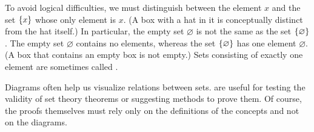 \begin{note}
  To avoid logical difficulties, we must distinguish between the element \(x\) and the set \(\left\lbrace x\right\rbrace\) whose only element is \(x\).
  (A box with a hat in it is conceptually distinct from the hat itself.)
  In particular, the empty set \(\varnothing\) is not the same as the set \(\left\lbrace\varnothing\right\rbrace\).
  The empty set \(\varnothing\) contains no elements, whereas the set \(\left\lbrace\varnothing\right\rbrace\) has one element \(\varnothing\).
  (A box that contains an empty box is not empty.)
  Sets consisting of exactly one element are sometimes called \textbf{}.
\end{note}

\begin{note}
  Diagrams often help us visualize relations between sets.
  \textbf{} are useful for testing the validity of set theory theorems or suggesting methods to prove them.
  Of course, the proofs themselves must rely only on the definitions of the concepts and not on the diagrams.
\end{note}
